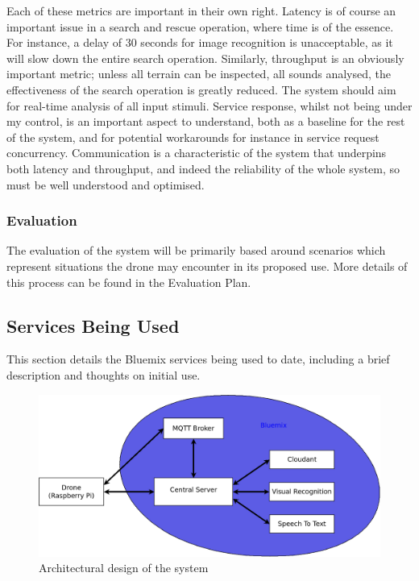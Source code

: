 \documentclass{article}
\begin{document}
\vspace{\baselineskip} \noindent
Each of these metrics are important in their own right. Latency is of course an important issue in a search and rescue operation, where time is of the essence. For instance, a delay of 30 seconds for image recognition is unacceptable, as it will slow down the entire search operation. Similarly, throughput is an obviously important metric; unless all terrain can be inspected, all sounds analysed, the effectiveness of the search operation is greatly reduced. The system should aim for real-time analysis of all input stimuli. Service response, whilst not being under my control, is an important aspect to understand, both as a baseline for the rest of the system, and for potential workarounds for instance in service request concurrency. Communication is a characteristic of the system that underpins both latency and throughput, and indeed the reliability of the whole system, so must be well understood and optimised.

\subsubsection{Evaluation}
The evaluation of the system will be primarily based around scenarios which represent situations the drone may encounter in its proposed use. More details of this process can be found in the Evaluation Plan.


\subsection{Services Being Used}
This section details the Bluemix services being used to date, including a brief description and thoughts on initial use.


\begin{figure}[h]
\caption{Architectural design of the system}
\includegraphics[width=\textwidth]{Architecture}
\end{figure}
\end{document}
